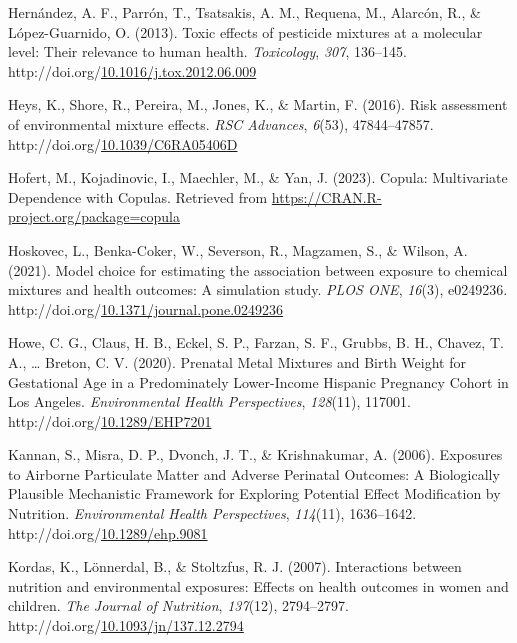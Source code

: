 \documentclass[12pt, twoside]{amherstthesis}
\newenvironment{CSLReferences}[2]%
  {}%
  {\par}
\begin{document}
\begin{CSLReferences}{1}{0}
\leavevmode{}%
Hernández, A. F., Parrón, T., Tsatsakis, A. M., Requena, M., Alarcón, R., \& López-Guarnido, O. (2013). Toxic effects of pesticide mixtures at a molecular level: {Their} relevance to human health. \emph{Toxicology}, \emph{307}, 136--145. http://doi.org/\href{https://doi.org/10.1016/j.tox.2012.06.009}{10.1016/j.tox.2012.06.009}

\leavevmode{}%
Heys, K., Shore, R., Pereira, M., Jones, K., \& Martin, F. (2016). Risk assessment of environmental mixture effects. \emph{RSC Advances}, \emph{6}(53), 47844--47857. http://doi.org/\href{https://doi.org/10.1039/C6RA05406D}{10.1039/C6RA05406D}

\leavevmode{}%
Hofert, M., Kojadinovic, I., Maechler, M., \& Yan, J. (2023). Copula: {Multivariate} {Dependence} with {Copulas}. Retrieved from \url{https://CRAN.R-project.org/package=copula}

\leavevmode{}%
Hoskovec, L., Benka-Coker, W., Severson, R., Magzamen, S., \& Wilson, A. (2021). Model choice for estimating the association between exposure to chemical mixtures and health outcomes: {A} simulation study. \emph{PLOS ONE}, \emph{16}(3), e0249236. http://doi.org/\href{https://doi.org/10.1371/journal.pone.0249236}{10.1371/journal.pone.0249236}

\leavevmode{}%
Howe, C. G., Claus, H. B., Eckel, S. P., Farzan, S. F., Grubbs, B. H., Chavez, T. A., \ldots{} Breton, C. V. (2020). Prenatal {Metal} {Mixtures} and {Birth} {Weight} for {Gestational} {Age} in a {Predominately} {Lower}-{Income} {Hispanic} {Pregnancy} {Cohort} in {Los} {Angeles}. \emph{Environmental Health Perspectives}, \emph{128}(11), 117001. http://doi.org/\href{https://doi.org/10.1289/EHP7201}{10.1289/EHP7201}

\leavevmode{}%
Kannan, S., Misra, D. P., Dvonch, J. T., \& Krishnakumar, A. (2006). Exposures to {Airborne} {Particulate} {Matter} and {Adverse} {Perinatal} {Outcomes}: {A} {Biologically} {Plausible} {Mechanistic} {Framework} for {Exploring} {Potential} {Effect} {Modification} by {Nutrition}. \emph{Environmental Health Perspectives}, \emph{114}(11), 1636--1642. http://doi.org/\href{https://doi.org/10.1289/ehp.9081}{10.1289/ehp.9081}

\leavevmode{}%
Kordas, K., Lönnerdal, B., \& Stoltzfus, R. J. (2007). Interactions between nutrition and environmental exposures: Effects on health outcomes in women and children. \emph{The Journal of Nutrition}, \emph{137}(12), 2794--2797. http://doi.org/\href{https://doi.org/10.1093/jn/137.12.2794}{10.1093/jn/137.12.2794}


\end{CSLReferences}
\end{document}
